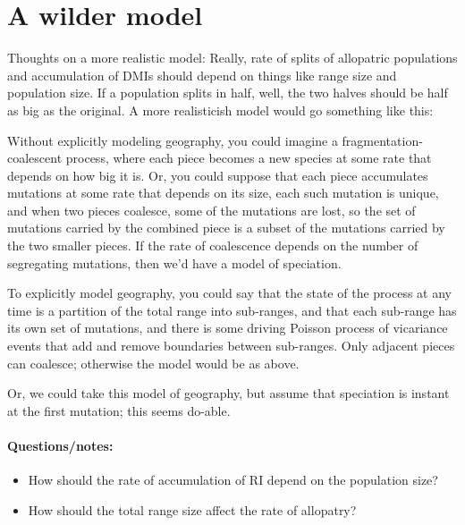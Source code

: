 \documentclass{article}
\begin{document}
\section{A wilder model}

Thoughts on a more realistic model:
Really, rate of splits of allopatric populations and accumulation of DMIs should depend on things like range size and population size.
If a population splits in half, well, the two halves should be half as big as the original.
A more realisticish model would go something like this:

Without explicitly modeling geography, you could imagine a fragmentation-coalescent process, 
where each piece becomes a new species at some rate that depends on how big it is.
Or, you could suppose that each piece accumulates mutations at some rate that depends on its size,
each such mutation is unique,
and when two pieces coalesce, some of the mutations are lost, so the set of mutations carried by the combined piece
is a subset of the mutations carried by the two smaller pieces.
If the rate of coalescence depends on the number of segregating mutations,
then we'd have a model of speciation.

To explicitly model geography, you could say that the state of the process at any time
is a partition of the total range into sub-ranges,
and that each sub-range has its own set of mutations,
and there is some driving Poisson process of vicariance events that add and remove boundaries between sub-ranges.
Only adjacent pieces can coalesce; otherwise the model would be as above.

Or, we could take this model of geography,
but assume that speciation is instant at the first mutation;
this seems do-able.

\paragraph{Questions/notes:}
\begin{itemize}
  \item How should the rate of accumulation of RI depend on the population size?
  \item How should the total range size affect the rate of allopatry?
\end{itemize}
\end{document}
